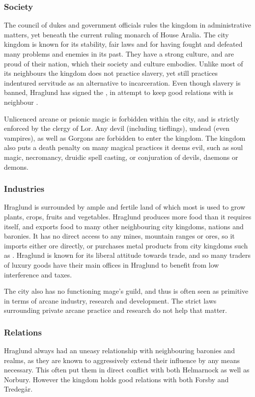 \subsubsection{Society}

The council of dukes and government officials rules the kingdom in
administrative matters, yet beneath the current ruling monarch of House
Aralia. The city kingdom is known for its stability, fair laws and for having
fought and defeated many problems and enemies in its past. They have a strong
culture, and are proud of their nation, which their society and culture
embodies. Unlike most of its neighbours the kingdom does not practice slavery,
yet still practices indentured servitude as an alternative to
incarceration. Even though slavery is banned, Hraglund has signed the
, in attempt to keep good relations with is
neighbour .

Unlicenced arcane or psionic magic is forbidden within the city, and is
strictly enforced by the clergy of Lor. Any devil (including tieflings),
undead (even vampires), as well as Gorgons are forbidden to enter the kingdom.
The kingdom also puts a death penalty on many magical practices it deems evil,
such as soul magic, necromancy, druidic spell casting, or conjuration of
devils, daemons or demons.

\subsubsection{Industries}

Hraglund is surrounded by ample and fertile land of which most is used to
grow plants, crops, fruits and vegetables. Hraglund produces more food than
it requires itself, and exports food to many other neighbouring city kingdoms,
nations and baronies. It has no direct access to any mines, mountain ranges or
ores, so it imports either ore directly, or purchases metal products from
city kingdoms such as . Hraglund is known for its liberal
attitude towards trade, and so many traders of luxury goods have their main
offices in Hraglund to benefit from low interference and taxes.

The city also has no functioning mage's guild, and thus is often seen as
primitive in terms of arcane industry, research and development. The strict
laws surrounding private arcane practice and research do not help that matter.

\subsubsection{Relations}

Hraglund always had an uneasy relationship with neighbouring baronies and
realms, as they are known to aggressively extend their influence by any means
necessary. This often put them in direct conflict with both Helmarnock as well
as Norbury. However the kingdom holds good relations with both Forsby and
Tredegår.
